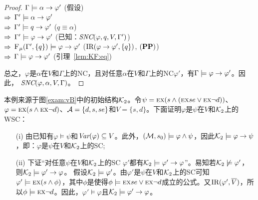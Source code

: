 \begin{proof}
	$\Gamma \models \alpha \rightarrow \varphi'$ \hfill  (假设)\\
	$\Rightarrow$ $\Gamma' \models \alpha \rightarrow \varphi'$ \\
	$\Rightarrow$ $\Gamma' \models q \rightarrow \varphi'$ \hfill  ($q \equiv \alpha$)\\
	$\Rightarrow$ $\Gamma' \models \varphi \rightarrow \varphi'$ \hfill (已知：$\emph{SNC}(\varphi,q,V,\Gamma')$)\\
	$\Rightarrow$ ${\textsc{F}_{\textsc{$\mu$}}}(\Gamma', \{q\}) \models \varphi \rightarrow \varphi'$ \hfill ($\textrm{IR}(\varphi \rightarrow \varphi', \{q\})$, $(\textbf{PP})$)\\
	$\Rightarrow$ $\Gamma \models \varphi \rightarrow \varphi'$ \hfill (引理~\ref{lem:KF:eq})
	
	总之，$\varphi$是$\alpha$在$V$和$\Gamma$上的NC，且对任意$\alpha$在$V$和$\Gamma$上的NC$\varphi'$，有$\Gamma \models \varphi \rightarrow \varphi'$。因此， $\emph{SNC}(\varphi,\alpha,V,\Gamma)$。
\end{proof}



\begin{example}\label{examp:WSC}
	本例来源于图\ref{exam:vB}中的初始结构${\cal K}_2$。令$\psi = \textsc{e} \textsc{x}(s \wedge (\textsc{e} \textsc{x} se \vee \textsc{e} \textsc{x} \neg d))$、$\varphi = \textsc{e} \textsc{x}(s \wedge \textsc{e} \textsc{x} \neg d)$、${\cal A} =\{d, s, se\}$和$V = \{s, d\}$。下面证明$\varphi$是$\psi$在$V$和${\cal K}_2$上的WSC：
	\begin{itemize}
		\item[(i)] 由已知有$\varphi \models \psi$和$\textit{Var}(\varphi) \subseteq V$。此外，$({\cal M}, s_0) \models \varphi \wedge \psi$，因此${\cal K}_2 \models \varphi \rightarrow \psi$，即：$\varphi$是$\psi$在$V$和${\cal K}_2$上的SC;
		\item[(ii)] 下证“对任意$\psi$在$V$和${\cal K}_2$上的SC $\varphi'$都有${\cal K}_2 \models \varphi' \rightarrow \varphi$”。易知若${\cal K}_2 \not \models \varphi'$，则${\cal K}_2\models \varphi' \rightarrow \varphi$。
		假设${\cal K}_2 \models \varphi'$。由$\varphi'$是$\psi$在$V$和${\cal K}_2$上的SC可知$\varphi' \models \textsc{e} \textsc{x}(s \wedge \phi)$，其中$\phi$是使得$\phi\models \textsc{e} \textsc{x} se \vee \textsc{e} \textsc{x} \neg d$成立的公式。又$\textrm{IR}(\varphi', \overline V)$，所以$\phi \models \textsc{e} \textsc{x} \neg d$。因此，$\varphi' \models \varphi$且${\cal K}_2 \models \varphi' \rightarrow \varphi$。
	\end{itemize}
\end{example}


